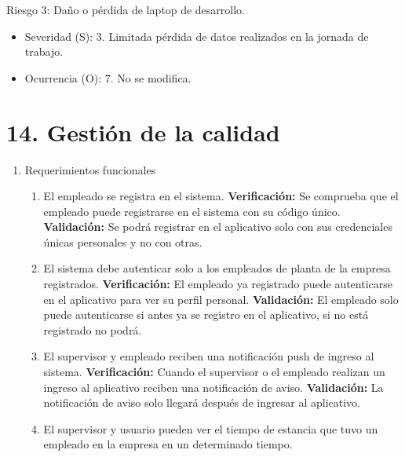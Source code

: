 \documentclass[
11pt, %
]{charter}
\begin{document}
Riesgo 3: Daño o pérdida de laptop de desarrollo.
\begin{itemize}
\item Severidad (S): 3. Limitada pérdida de datos realizados en la jornada de trabajo.
\item Ocurrencia (O): 7. No se modifica.
\end{itemize}





\section{14. Gestión de la calidad}
\label{sec:calidad}

\begin{enumerate}
	\item Requerimientos funcionales
		\begin{enumerate}
			\item El empleado se registra en el sistema.
			\newline
			\textbf{Verificación:}
			Se comprueba que el empleado puede registrarse en el sistema con su código único.
			\newline
		    \textbf{Validación:}
		    Se podrá registrar en el aplicativo solo con sus credenciales únicas personales y no con otras.
			\item El sistema debe autenticar solo a los empleados de planta de la empresa registrados.
			\newline
			\textbf{Verificación:}
			El empleado ya registrado puede autenticarse en el aplicativo para ver su perfil personal.
			\newline
		    \textbf{Validación:}
		    El empleado solo puede autenticarse si antes ya se registro en el aplicativo, si no está registrado no podrá.
			\item El supervisor y empleado reciben una notificación push de ingreso al sistema.
			\newline
			\textbf{Verificación:}
			Cuando el supervisor o el empleado realizan un ingreso al aplicativo reciben una notificación de aviso.
			\newline
		    \textbf{Validación:}
		    La notificación de aviso solo llegará después de ingresar al aplicativo.
			\item El supervisor y usuario pueden ver el tiempo de estancia que tuvo un empleado en la empresa en un determinado tiempo.
			\newline

\end{enumerate}
\end{enumerate}
\end{document}
